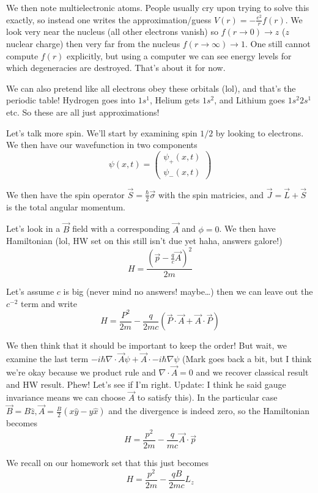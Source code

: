 \documentclass[10pt]{report}
\begin{document}
We then note multielectronic atoms. People usually cry upon trying to solve this exactly, so instead one writes the approximation/guess $V(r) = -\frac{e^2}{r}f(r)$. We look very near the nucleus (all other electrons vanish) so $f(r\to 0) \to z$ ($z$ nuclear charge) then very far from the nucleus $f(r \to \infty) \to 1$. One still cannot compute $f(r)$ explicitly, but using a computer we can see energy levels for which degeneracies are destroyed. That's about it for now.

We can also pretend like all electrons obey these orbitals (lol), and that's the periodic table! Hydrogen goes into $1s^1$, Helium gets $1s^2$, and Lithium goes $1s^2 2s^1$ etc. So these are all just approximations!

Let's talk more spin. We'll start by examining spin $1/2$ by looking to electrons. We then have our wavefunction in two components
$$\psi(x,t) = \begin{pmatrix}\psi_+(x,t)\\ \psi_-(x,t)\end{pmatrix}$$

We then have the spin operator $\vec{S} = \frac{\hbar}{2}\vec{\sigma}$ with the spin matricies, and $\vec{J} = \vec{L} + \vec{S}$ is the total angular momentum. 

Let's look in a $\vec{B}$ field with a corresponding $\vec{A}$ and $\phi = 0$. We then have Hamiltonian (lol, HW set on this still isn't due yet haha, answers galore!)
$$H = \frac{\left( \vec{p} - \frac{q}{c}\vec{A} \right)^2}{2m}$$

Let's assume $c$ is big (never mind no answers! maybe\dots) then we can leave out the $c^{-2}$ term and write
$$H = \frac{P^2}{2m} -\frac{q}{2mc}\left( \vec{P}\cdot \vec{A} + \vec{A}\cdot \vec{P} \right)$$

We then think that it should be important to keep the order! But wait, we examine the last term $-i\hbar \nabla \cdot \vec{A}\psi + \vec{A}\cdot -i\hbar \nabla \psi$ (Mark goes back a bit, but I think we're okay because we product rule and $\nabla \cdot \vec{A} = 0$ and we recover classical result and HW result. Phew! Let's see if I'm right. Update: I think he said gauge invariance means we can choose $\vec{A}$ to satisfy this). In the particular case $\vec{B} = B\hat{z}, \vec{A} = \frac{B}{2}\left( x\hat{y} - y\hat{x} \right)$ and the divergence is indeed zero, so the Hamiltonian becomes
$$H = \frac{p^2}{2m} - \frac{q}{mc}\vec{A}\cdot \vec{p}$$

We recall on our homework set that this just becomes
$$H = \frac{p^2}{2m} - \frac{qB}{2mc}L_z$$
\end{document}
